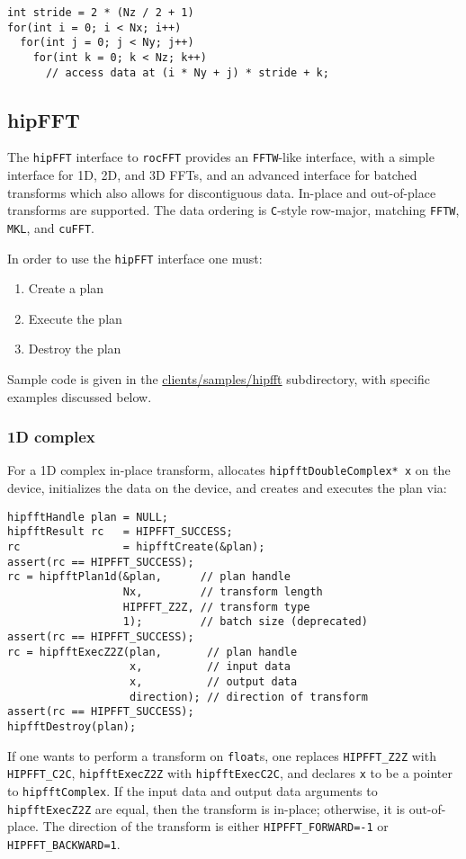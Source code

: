 \documentclass[10pt]{article}
\renewcommand{\(}{\left(}
\renewcommand{\)}{\right)}
\begin{document}
\begin{lstlisting}
int stride = 2 * (Nz / 2 + 1)
for(int i = 0; i < Nx; i++)
  for(int j = 0; j < Ny; j++)
    for(int k = 0; k < Nz; k++)
      // access data at (i * Ny + j) * stride + k;
\end{lstlisting}

\subsection{hipFFT}


The \texttt{hipFFT} interface to \texttt{rocFFT} provides an
\texttt{FFTW}-like interface, with a simple interface for 1D, 2D, and
3D FFTs, and an advanced interface for batched transforms which also
allows for discontiguous data.  In-place and out-of-place transforms
are supported.  The data ordering is \texttt{C}-style row-major, matching
\texttt{FFTW}, \texttt{MKL}, and \texttt{cuFFT}.

In order to use the \texttt{hipFFT} interface one must:
\begin{enumerate}
\item Create a plan
\item Execute the plan
\item Destroy the plan
\end{enumerate}
Sample code is given in the \url{clients/samples/hipfft} subdirectory,
with specific examples discussed below.

\subsubsection{1D complex}
For a 1D complex in-place transform, allocates
\lstinline{hipfftDoubleComplex* x} on the device, initializes the data
on the device, and creates and executes the plan via:
\begin{lstlisting}
hipfftHandle plan = NULL;
hipfftResult rc   = HIPFFT_SUCCESS;
rc                = hipfftCreate(&plan);
assert(rc == HIPFFT_SUCCESS);
rc = hipfftPlan1d(&plan,      // plan handle
                  Nx,         // transform length
                  HIPFFT_Z2Z, // transform type 
                  1);         // batch size (deprecated)
assert(rc == HIPFFT_SUCCESS);
rc = hipfftExecZ2Z(plan,       // plan handle
                   x,          // input data
                   x,          // output data
                   direction); // direction of transform
assert(rc == HIPFFT_SUCCESS);
hipfftDestroy(plan);
\end{lstlisting}
If one wants to perform a transform on \lstinline{float}s, one
replaces \lstinline{HIPFFT_Z2Z} with \lstinline{HIPFFT_C2C},
\lstinline{hipfftExecZ2Z} with \lstinline{hipfftExecC2C}, and declares
\lstinline{x} to be a pointer to \lstinline{hipfftComplex}.  If the
input data and output data arguments to \lstinline{hipfftExecZ2Z} are
equal, then the transform is in-place; otherwise, it is out-of-place.
The direction of the transform is either \lstinline{HIPFFT_FORWARD=-1}
or \lstinline{HIPFFT_BACKWARD=1}.
\end{document}
